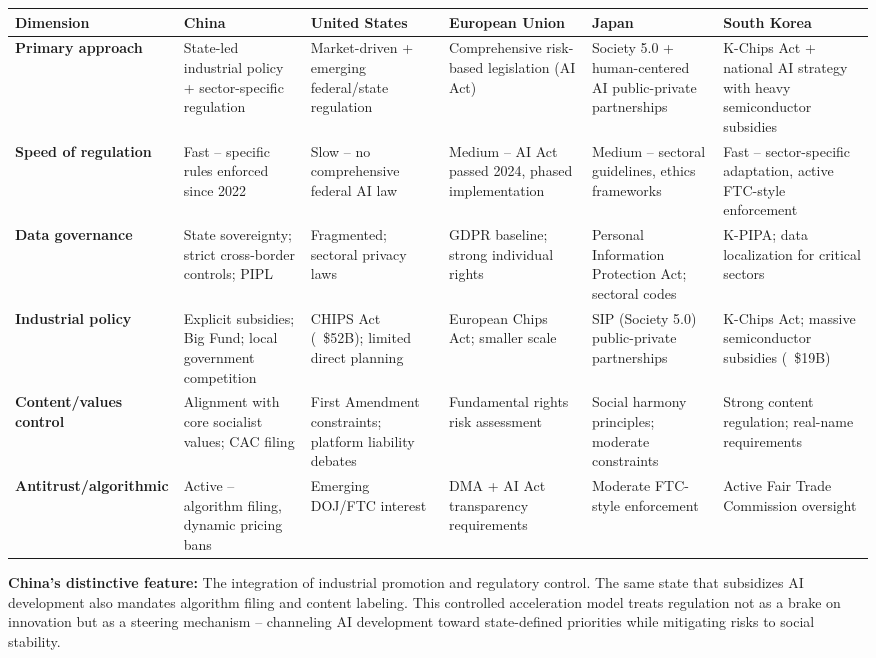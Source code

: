 \documentclass[11pt,a4paper]{article}
\begin{document}
\begin{table}[h]
\centering\small
\begin{tabular}{@{llllll@}}
\toprule
Dimension & China & United States & European Union & Japan & South Korea \\
\midrule
\textbf{Primary approach} & State-led industrial policy + sector-specific regulation & Market-driven + emerging federal/state regulation & Comprehensive risk-based legislation (AI Act) & Society 5.0 + human-centered AI public-private partnerships & K-Chips Act + national AI strategy with heavy semiconductor subsidies \\
\textbf{Speed of regulation} & Fast -- specific rules enforced since 2022 & Slow -- no comprehensive federal AI law & Medium -- AI Act passed 2024, phased implementation & Medium -- sectoral guidelines, ethics frameworks & Fast -- sector-specific adaptation, active FTC-style enforcement \\
\textbf{Data governance} & State sovereignty; strict cross-border controls; PIPL & Fragmented; sectoral privacy laws & GDPR baseline; strong individual rights & Personal Information Protection Act; sectoral codes & K-PIPA; data localization for critical sectors \\
\textbf{Industrial policy} & Explicit subsidies; Big Fund; local government competition & CHIPS Act (~\$52B); limited direct planning & European Chips Act; smaller scale & SIP (Society 5.0) public-private partnerships & K-Chips Act; massive semiconductor subsidies (~\$19B) \\
\textbf{Content/values control} & Alignment with core socialist values; CAC filing & First Amendment constraints; platform liability debates & Fundamental rights risk assessment & Social harmony principles; moderate constraints & Strong content regulation; real-name requirements \\
\textbf{Antitrust/algorithmic} & Active -- algorithm filing, dynamic pricing bans & Emerging DOJ/FTC interest & DMA + AI Act transparency requirements & Moderate FTC-style enforcement & Active Fair Trade Commission oversight \\
\bottomrule
\end{tabular}
\end{table}

\textbf{China's distinctive feature:} The integration of industrial promotion and regulatory control. The same state that subsidizes AI development also mandates algorithm filing and content labeling. This controlled acceleration model treats regulation not as a brake on innovation but as a steering mechanism -- channeling AI development toward state-defined priorities while mitigating risks to social stability.
\end{document}
